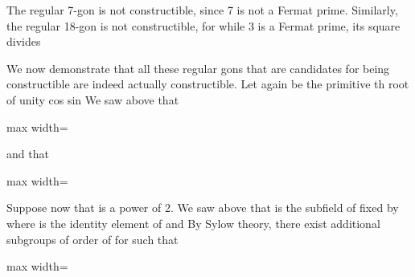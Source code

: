 \documentclass[11pt,oneside]{article}
\begin{document}
\begin{BookBody}

 The regular 7-gon is not constructible, since 7 is not a Fermat prime. Similarly, the regular 18-gon is not constructible, for while 3 is a Fermat prime, its square divides \BookEnd{\blacktriangle}

We now demonstrate that all these regular gons that are candidates for being constructible are indeed actually constructible. Let \BookInline{\zeta } again be the primitive th root of unity cos sin We saw above that

\begin{center}\begin{adjustbox}{max width=\linewidth}\end{adjustbox}\end{center}

\noindent and that

\begin{center}\begin{adjustbox}{max width=\linewidth}\end{adjustbox}\end{center}

\noindent Suppose now that  is a power  of 2. We saw above that  is the subfield of  fixed by  where \BookInline{\iota } is the identity element of  and \BookInline{\tau (\zeta )= }  By Sylow theory, there exist additional subgroups  of order  of  for  such that

\begin{center}\begin{adjustbox}{max width=\linewidth}\end{adjustbox}\end{center}


\end{BookBody}
\end{document}
